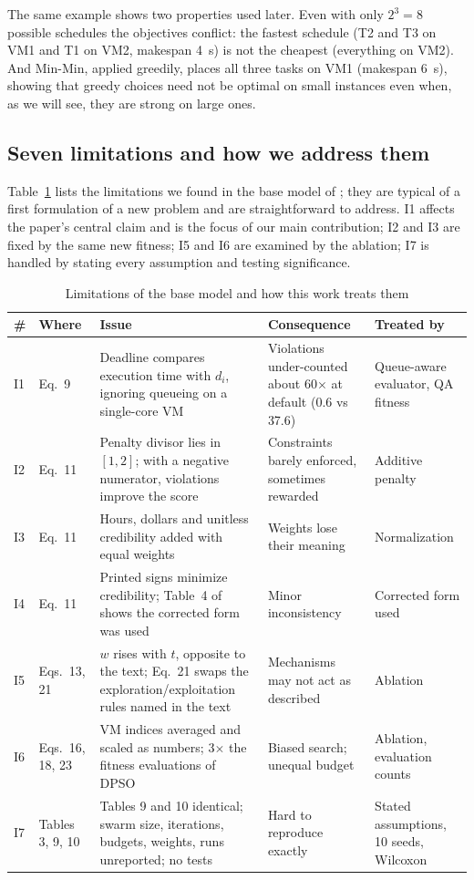 \documentclass[pdflatex,sn-basic]{sn-jnl}
\theoremstyle{thmstyleone}%
\theoremstyle{thmstyletwo}%
\theoremstyle{thmstylethree}%
\begin{document}
The same example shows two properties used later. Even with only $2^3=8$ possible schedules the objectives conflict: the fastest schedule (T2 and T3 on VM1 and T1 on VM2, makespan 4~s) is not the cheapest (everything on VM2). And Min-Min, applied greedily, places all three tasks on VM1 (makespan 6~s), showing that greedy choices need not be optimal on small instances even when, as we will see, they are strong on large ones.

\subsection{Seven limitations and how we address them}\label{sec4.2}
Table~\ref{tab:issues} lists the limitations we found in the base model of \citet{ouyang2025}; they are typical of a first formulation of a new problem and are straightforward to address. I1 affects the paper's central claim and is the focus of our main contribution; I2 and I3 are fixed by the same new fitness; I5 and I6 are examined by the ablation; I7 is handled by stating every assumption and testing significance.

\begin{table}[!t]
\caption{Limitations of the base model \citep{ouyang2025} and how this work treats them}\label{tab:issues}
\footnotesize
\setlength{\tabcolsep}{3pt}
\begin{tabular}{@{}llp{3.9cm}p{2.5cm}p{2.1cm}@{}}
\toprule
\# & Where & Issue & Consequence & Treated by\\
\midrule
I1 & Eq.~9 & Deadline compares execution time with $d_i$, ignoring queueing on a single-core VM & Violations under-counted about 60$\times$ at default (0.6 vs 37.6) & Queue-aware evaluator, QA fitness\\
I2 & Eq.~11 & Penalty divisor lies in $[1,2]$; with a negative numerator, violations improve the score & Constraints barely enforced, sometimes rewarded & Additive penalty\\
I3 & Eq.~11 & Hours, dollars and unitless credibility added with equal weights & Weights lose their meaning & Normalization\\
I4 & Eq.~11 & Printed signs minimize credibility; Table~4 of \citet{ouyang2025} shows the corrected form was used & Minor inconsistency & Corrected form used\\
I5 & Eqs.~13, 21 & $w$ rises with $t$, opposite to the text; Eq.~21 swaps the exploration/exploitation rules named in the text & Mechanisms may not act as described & Ablation\\
I6 & Eqs.~16, 18, 23 & VM indices averaged and scaled as numbers; 3$\times$ the fitness evaluations of DPSO & Biased search; unequal budget & Ablation, evaluation counts\\
I7 & Tables 3, 9, 10 & Tables 9 and 10 identical; swarm size, iterations, budgets, weights, runs unreported; no tests & Hard to reproduce exactly & Stated assumptions, 10 seeds, Wilcoxon\\
\bottomrule
\end{tabular}
\end{table}
\end{document}
